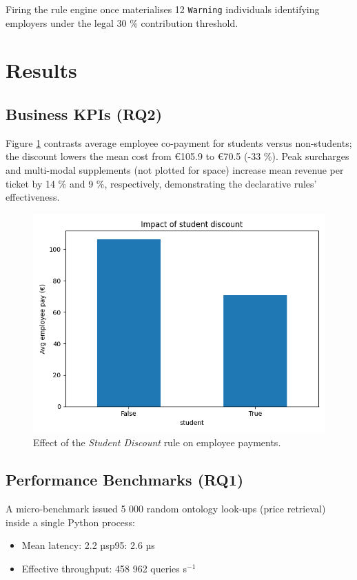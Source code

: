 \documentclass[lettersize,journal]{IEEEtran}
\begin{document}
Firing the rule engine once materialises 12 \texttt{Warning} individuals identifying employers under the legal 30 \% contribution threshold.

\section{Results}
\subsection{Business KPIs (\textbf{RQ2})}
Figure \ref{fig:kpi} contrasts average employee co-payment for students versus non-students; the discount lowers the mean cost from €105.9 to €70.5 (-33 \%).  
Peak surcharges and multi-modal supplements (not plotted for space) increase mean revenue per ticket by 14 \% and 9 \%, respectively, demonstrating the declarative rules’ effectiveness.

\begin{figure}[!t]
\centering
\includegraphics[width=.9\linewidth]{figs/kpi_student.png}
\caption{Effect of the \emph{Student Discount} rule on employee payments.}
\label{fig:kpi}
\end{figure}

\subsection{Performance Benchmarks (\textbf{RQ1})}
A micro-benchmark issued 5 000 random ontology look-ups (price retrieval) inside a single Python process:

\begin{itemize}
\item Mean latency: 2.2 µs\;p95: 2.6 µs
\item Effective throughput: 458 962 queries s$^{-1}$
\end{itemize}
\end{document}
